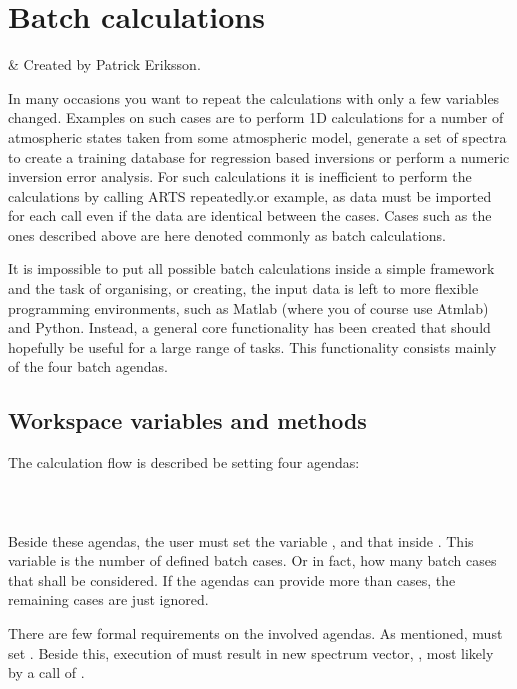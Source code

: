 \chapter{Batch calculations}
 \label{sec:batch}


%
%
 & Created by Patrick Eriksson.\\
\stophistory

In many occasions you want to repeat the calculations with only a few
variables changed. Examples on such cases are to perform 1D
calculations for a number of atmospheric states taken from some
atmospheric model, generate a set of spectra to create a training
database for regression based inversions or perform a numeric
inversion error analysis. For such calculations it is inefficient to
perform the calculations by calling ARTS repeatedly.or example, as
data must be imported for each call even if the data are identical
between the cases. Cases such as the ones described above are here
denoted commonly as batch calculations.

It is impossible to put all possible batch calculations inside a
simple framework and the task of organising, or creating, the input
data is left to more flexible programming environments, such as
Matlab (where you of course use Atmlab) and Python. Instead, a general
core functionality has been created that should hopefully be useful
for a large range of tasks. This functionality consists mainly of the
four batch agendas.


\section{Workspace variables and methods}
%
The calculation flow is described be setting four agendas:
  \indent {} \\
  \indent {} \\
  \indent {} \\
  \indent {} \\
Beside these agendas, the user must set the variable ,
and that inside . This variable is the number
of defined batch cases. Or in fact, how many batch cases that shall be 
considered. If the agendas can provide more than  cases,
the remaining cases are just ignored.

There are few formal requirements on the involved agendas. As
mentioned,  must set
. Beside this, execution of
 must result in new spectrum vector,
, most likely by a call of . 




